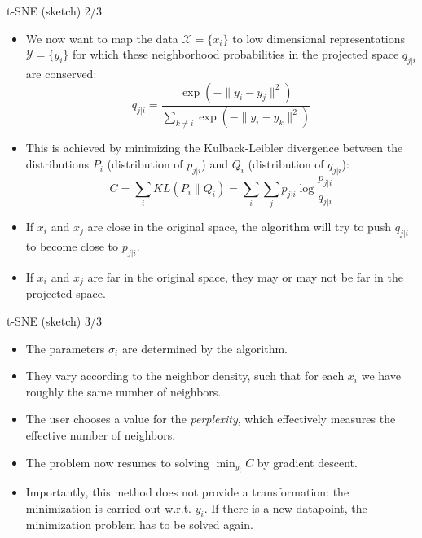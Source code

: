 \documentclass[xcolor=pdftex,dvipsnames,table]{beamer}
\begin{document}
\begin{frame}{t-SNE (sketch) 2/3}
\begin{itemize}

	\item We now want to map the data $\mathcal{X} = \{x_i\}$ to low dimensional representations $\mathcal{Y} = \{y_i\}$ for which these neighborhood probabilities in the projected space $q_{j|i}$ are conserved: 
	\begin{equation}
	q_{j|i} = \frac{\exp{\left(-\|y_i - y_j\|^2\right)}}{\sum_{k\neq i} \exp{\left(-\|y_i - y_k\|^2\right)} }
	\end{equation}
	\item This is achieved by minimizing the Kulback-Leibler divergence between the distributions $P_i$ (distribution of $p_{j|i}$) and $Q_i$ (distribution of $q_{j|i}$): 
	\begin{equation}
		C = \sum_i KL(P_i\|Q_i) = \sum_i \sum_j p_{j|i}\log{\frac{p_{j|i}}{q_{j|i}}}
	\end{equation}
	\item If $x_i$ and $x_j$ are close in the original space, the algorithm will try to push $q_{j|i}$ to become close to $p_{j|i}$. 
	\item If $x_i$ and $x_j$ are far in the original space, they may or may not be far in the projected space. 
\end{itemize}
\end{frame}

\begin{frame}{t-SNE (sketch) 3/3}
\begin{itemize}
	\item The parameters $\sigma_i$ are determined by the algorithm. 
	\item They vary according to the neighbor density, such that for each $x_i$ we have roughly the same number of neighbors. 
	\item The user chooses a value for the \textit{perplexity}, which effectively measures the effective number of neighbors. 
	\item The problem now resumes to solving $\min_{y_i} C$ by gradient descent.
	\item Importantly, this method does not provide a transformation: the minimization is carried out w.r.t. $y_i$. If there is a new datapoint, the minimization problem has to be solved again. 
\end{itemize}
\end{frame}

\end{document}
